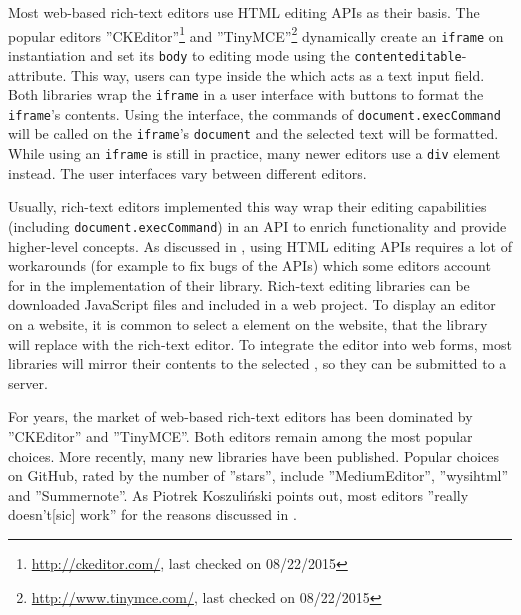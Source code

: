 Most web-based rich-text editors use HTML editing APIs as their basis. The popular editors ''CKEditor''\footnote{\url{http://ckeditor.com/}, last checked on 08/22/2015} and ''TinyMCE''\footnote{\url{http://www.tinymce.com/}, last checked on 08/22/2015} dynamically create an \texttt{iframe} on instantiation and set its \texttt{body} to editing mode using the \texttt{contenteditable}-attribute. This way, users can type inside the  which acts as a text input field. Both libraries wrap the \texttt{iframe} in a user interface with buttons to format the \texttt{iframe}'s contents. Using the interface, the commands of \texttt{document.execCommand} will be called on the \texttt{iframe}'s \texttt{document} and the selected text will be formatted. While using an \texttt{iframe} is still in practice, many newer editors use a  \texttt{div} element instead. The user interfaces vary between different editors. %

Usually, rich-text editors implemented this way wrap their editing capabilities (including \texttt{document.execCommand}) in an API to enrich functionality and provide higher-level concepts. As discussed in , using HTML editing APIs requires a lot of workarounds (for example to fix bugs of the APIs) which some editors account for in the implementation of their library. Rich-text editing libraries can be downloaded JavaScript files and included in a web project. To display an editor on a website, it is common to select a  element on the website, that the library will replace with the rich-text editor. To integrate the editor into web forms, most libraries will mirror their contents to the selected , so they can be submitted to a server.

For years, the market of web-based rich-text editors has been dominated by ''CKEditor'' and ''TinyMCE''. Both editors remain among the most popular choices. More recently, many new libraries have been published. Popular choices on GitHub, rated by the number of ''stars'', include ''MediumEditor'', ''wysihtml'' and ''Summernote''. As Piotrek Koszuli\'{n}ski points out, most editors ''really doesn't[sic] work'' \cite{bj} for the reasons discussed in .

